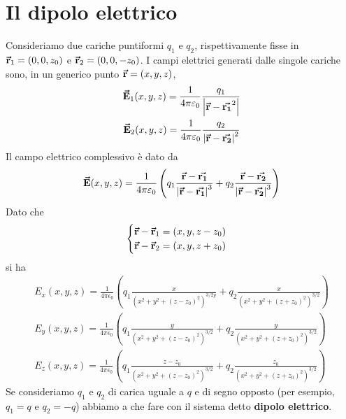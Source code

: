 \section{Il dipolo elettrico}
Consideriamo due cariche puntiformi $q_1$ e $q_2$, rispettivamente fisse in $\vb*{\va{r}}_1=\left(0,0,z_0\right)$ e $\vb*{\va{r}}_2=\left(0,0,-z_0\right)$. I campi elettrici generati dalle singole cariche sono, in un generico punto $\vb*{\va{r}}=(x,y,z)$,
\begin{gather*}
	\vb*{\va{E}}_1(x,y,z)=\frac{1}{4\pi\varepsilon_0}\frac{q_1}{\abs{\vb*{\va{r}}-\vb*{\va{r_1}}^2}}\\
	\vb*{\va{E}}_2(x,y,z)=\frac{1}{4\pi\varepsilon_0}\frac{q_2}{\abs{\vb*{\va{r}}-\vb*{\va{r_2}}}^2}
\end{gather*}
Il campo elettrico complessivo è dato da
\begin{equation}
	\vb*{\va{E}}(x,y,z)=\frac{1}{4\pi\varepsilon_0}\left(q_1\frac{\vb*{\va{r}}-\vb*{\va{r_1}}}{\abs{\vb*{\va{r}}-\vb*{\va{r_1}}}^3}+q_2\frac{\vb*{\va{r}}-\vb*{\va{r_2}}}{\abs{\vb*{\va{r}}-\vb*{\va{r_2}}}^3}\right)
\end{equation}
Dato che
\begin{equation*}
	\begin{cases}
		\vb*{\va{r}}-\vb*{\va{r}}_1=\left(x,y,z-z_0\right)\\
		\vb*{\va{r}}-\vb*{\va{r}}_2=\left(x,y,z+z_0\right)
	\end{cases}
\end{equation*}
si ha
\begin{gather*}
	E_x(x,y,z)=\frac{1}{4\pi\epsilon_0}\left(q_1\frac{x}{(x^2+y^2+(z-z_0)^2)^{3/2y}}+q_2\frac{x}{(x^2+y^2+(z+z_0)^2)^{3/2}}\right)\\
	E_y(x,y,z)=\frac{1}{4\pi\epsilon_0}\left(q_1\frac{y}{(x^2+y^2+(z-z_0)^2)^{3/2}}+q_2\frac{y}{(x^2+y^2+(z+z_0)^2)^{3/2}}\right)\\
	E_z(x,y,z)=\frac{1}{4\pi\epsilon_0}\left(q_1\frac{z-z_0}{(x^2+y^2+(z-z_0)^2)^{3/2}}+q_2\frac{z_0}{(x^2+y^2+(z+z_0)^2)^{3/2}}\right)
\end{gather*}
Se consideriamo $q_1$ e $q_2$ di carica uguale a $q$ e di segno opposto (per esempio, $q_1=q$ e $q_2=-q$) abbiamo a che fare con il sistema detto \textbf{dipolo elettrico}.

